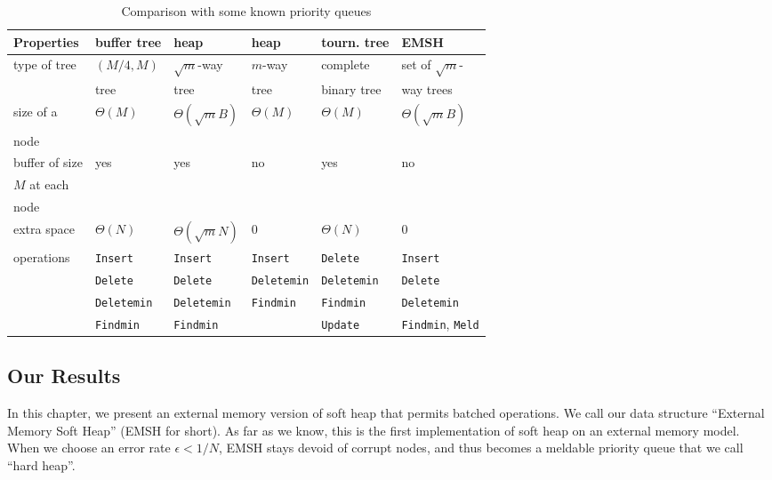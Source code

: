\begin{table}
\begin{center}
            \begin{tabular}{|l|l|l|l|l|l|}
\cline{1-6}
               \hline
{\bf Properties}  &   {\bf buffer tree}     & {\bf heap} \cite{KS96}      & {\bf heap} \cite{FJKT99}    & {\bf tourn. tree}
   & {\bf EMSH} \\
\hline \hline
type of tree &  $(M/4,M)$   & $\sqrt{m}$-way & $m$-way & complete & set of
                                                                      $\sqrt{m}$- \\
             &  tree        & tree           & tree    & binary tree & way trees \\
\hline
size of a     & $\Theta(M)$              & $\Theta(\sqrt{m}B)$  & $\Theta(M)$        & $\Theta(M
)$    & $\Theta(\sqrt{m}B)$ \\
node          &                  &                &          &        &        \\
\hline
buffer of size &    yes          &   yes          & no       & yes    & no  \\
$M$ at each    &                 &                &          &        &   \\
node            &                 &                &          &        &   \\
\hline
extra space    & $\Theta(N)$     &  $\Theta(\sqrt{m}N)$ & 0   & $\Theta(N)$ & 0 \\
\hline
operations     & {\tt Insert} & {\tt Insert}    & {\tt Insert}    & {\tt Delete}    & {\tt Insert} \\
               & {\tt Delete} & {\tt Delete}    & {\tt Deletemin} & {\tt Deletemin} & {\tt Delete} \\
            & {\tt Deletemin} & {\tt Deletemin} & {\tt Findmin}   & {\tt Findmin}   & {\tt Deletemin} \\
            & {\tt Findmin}   & {\tt Findmin}   &                 & {\tt Update}& {\tt Findmin}, {\tt Meld} \\
\hline
\end{tabular}
\caption{Comparison with some known priority queues }
\label{comparison:emsh}
\end{center}
\end{table}
\subsection{Our Results}
In this chapter, we present an external memory version of soft heap that permits
batched operations. We call our data structure ``External Memory Soft Heap''
(EMSH for short). 
As far as we know, this is the first implementation of soft heap
on an external memory model. 
When we choose an error rate $\epsilon<1/N$, EMSH stays devoid of corrupt nodes, 
and thus becomes a meldable priority queue that we call ``hard heap''.  


